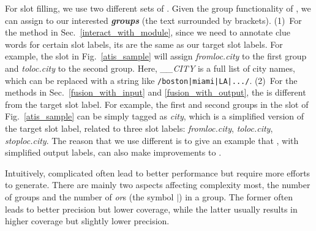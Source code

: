 For slot filling, we use two different sets of \REs. Given the group functionality of \RE, we can assign \REtags to our interested
\textbf{\emph{\RE groups}} (the text surrounded by brackets). (1)~For the method in Sec.~\ref{interact_with_module}, since we need to
annotate clue words for certain slot labels, its \REtags are the same as our target slot labels.
For example, the slot \RE in Fig.~\ref{atis_sample} will assign \emph{fromloc.city} to the first \RE group and \emph{toloc.city} to the second group.
Here, \emph{\_\_CITY} is a full list of city names, which can be replaced with a string like \texttt{/boston|miami|LA|.../}. 
(2)~For the methods in Sec.~\ref{fusion_with_input} and \ref{fusion_with_output}, the
\REtag is different from the target slot label.
For example, the first and second \RE groups in the slot \RE of Fig.~\ref{atis_sample} can be simply tagged as \emph{city},
which is a simplified version of the target slot label, related to three slot labels: \emph{fromloc.city}, \emph{toloc.city}, \emph{stoploc.city}.
The reason that we use different \REs is to give an example that \REs,
with simplified output labels, can also make improvements to \NN.


Intuitively, complicated \REs often lead to better performance but require more efforts to generate. %
There are mainly two aspects affecting \RE complexity most, the number of \RE groups and the number of \emph{or}s (the symbol $|$) in a \RE group.
The former often leads to better precision but lower coverage, while the latter usually results in higher coverage but slightly lower precision.

